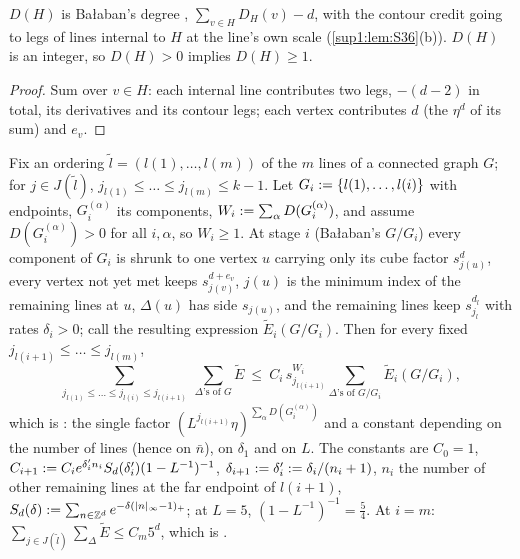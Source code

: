\begin{lemma}[dictionary]\label{sup1:lem:S50}
$D(H)$ is Ba{\l}aban's degree \cite[(2.2)]{Ba3}, $\sum_{v\in H}D_H(v)-d$, with the contour credit going to legs of lines internal to $H$ at the line's own scale (\cref{sup1:lem:S36}(b)). $D(H)$ is an integer, so $D(H)>0$ implies $D(H)\ge1$.
\end{lemma}

\begin{proof}
Sum \cite[(2.1)]{Ba3} over $v\in H$: each internal line contributes two legs, $-(d-2)$ in total, its derivatives and its contour legs; each vertex contributes $d$ (the $\eta^d$ of its sum) and $e_v$.
\end{proof}

\begin{theorem}\label{sup1:thm:S51}
Fix an ordering $\tilde l=(l(1),\dots,l(m))$ of the $m$ lines of a connected graph $G$; for $j\in J(\tilde l)$, $j_{l(1)}\le\dots\le j_{l(m)}\le k-1$. Let $G_i:=\{l(1),\dots,l(i)\}$ with endpoints, $G^{(\alpha)}_i$ its components, $W_i:=\sum_\alpha D(G^{(\alpha)}_i)$, and assume $D(G^{(\alpha)}_i)>0$ for all $i,\alpha$, so $W_i\ge1$. At stage $i$ (Ba{\l}aban's $G/G_i$) every component of $G_i$ is shrunk to one vertex $u$ carrying only its cube factor $s_{j(u)}^d$, every vertex not yet met keeps $s_{j(v)}^{d+e_v}$, $j(u)$ is the minimum index of the remaining lines at $u$, $\Delta(u)$ has side $s_{j(u)}$, and the remaining lines keep $s_{j_l}^{d_l}$ with rates $\delta_i>0$; call the resulting expression $\tilde E_i(G/G_i)$. Then for every fixed $j_{l(i+1)}\le\dots\le j_{l(m)}$,
\begin{equation}\label{sup1:eq:216}
\sum_{j_{l(1)}\le\dots\le j_{l(i)}\le j_{l(i+1)}}\ \sum_{\Delta\text{'s of }G}\tilde E\ \le\ C_i\,s_{j_{l(i+1)}}^{W_i}\sum_{\Delta\text{'s of }G/G_i}\tilde E_i(G/G_i),
\end{equation}
which is \cite[(2.16)]{Ba3}: the single factor $(L^{j_{l(i+1)}}\eta)^{\sum_\alpha D(G^{(\alpha)}_i)}$ and a constant depending on the number of lines (hence on $\bar n$), on $\delta_1$ and on $L$. The constants are $C_0=1$, $C_{i+1}:= C_ie^{\delta_i'n_i}S_d(\delta_i')(1-L^{-1})^{-1}$, $\delta_{i+1}:=\delta_i':=\delta_i/(n_i+1)$, $n_i$ the number of other remaining lines at the far endpoint of $l(i+1)$, $S_d(\delta):=\sum_{n\in\mathbb Z^d}e^{-\delta(|n|_\infty-1)_+}$; at $L=5$, $(1-L^{-1})^{-1}=\frac54$. At $i=m$: $\sum_{j\in J(\tilde l)}\sum_\Delta\tilde E\le C_m5^d$, which is \cite[(2.15)]{Ba3}.
\end{theorem}

